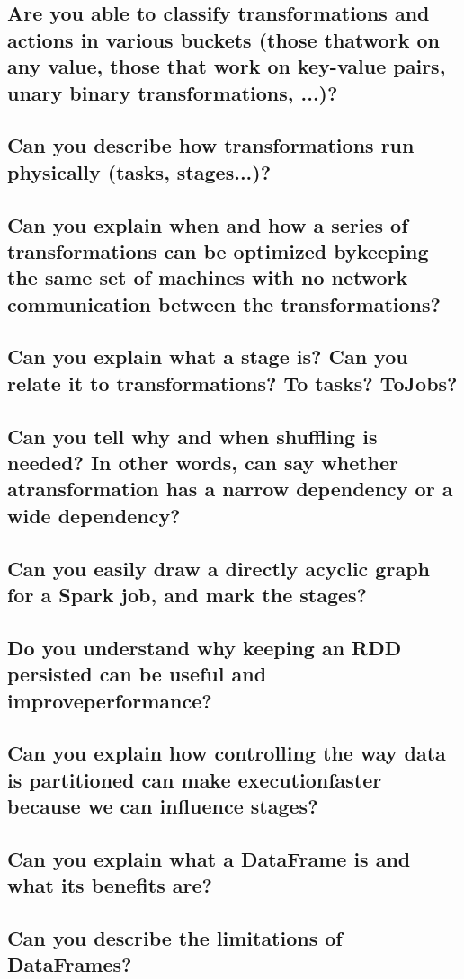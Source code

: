 \documentclass{article}
\begin{document}
\subsection{Are you able to classify transformations and actions in various buckets (those thatwork on any value, those that work on key-value pairs, unary binary transformations, ...)?}
\subsection{Can you describe how transformations run physically (tasks, stages...)?}
\subsection{Can you explain when and how a series of transformations can be optimized bykeeping the same set of machines with no network communication between the transformations?}
\subsection{Can you explain what a stage is? Can you relate it to transformations? To tasks? ToJobs?}
\subsection{Can you tell why and when shuffling is needed? In other words, can say whether atransformation has a narrow dependency or a wide dependency?}
\subsection{Can you easily draw a directly acyclic graph for a Spark job, and mark the stages?}
\subsection{Do you understand why keeping an RDD persisted can be useful and improveperformance?}
\subsection{Can you explain how controlling the way data is partitioned can make executionfaster because we can influence stages?}
\subsection{Can you explain what a DataFrame is and what its benefits are?}
\subsection{Can you describe the limitations of DataFrames?}
\end{document}
